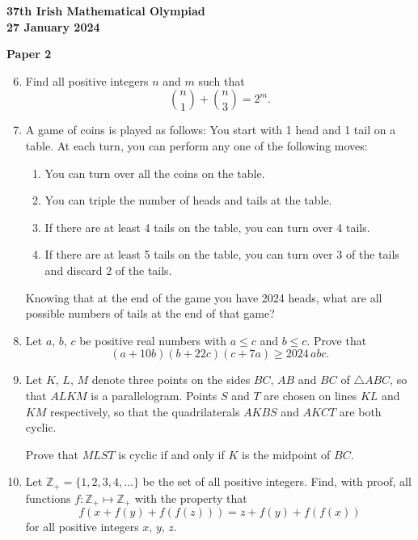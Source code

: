 \documentclass[12pt]{article}
\begin{document}
\newpage
\begin{center}
{\large\bfseries 37th Irish Mathematical Olympiad\\27 January 2024}
\end{center}
\bigskip\noindent\textbf{Paper 2}\bigskip
\begin{enumerate}
\setcounter{enumi}{5}
\item Find all positive integers $n$ and $m$ such that
\[
\binom{n}{1} + \binom{n}{3} = 2^m.
\]

\item A game of coins is played as follows: You start with 1 head and 1 tail on a table. At each turn, you can perform any one of the following moves:
\begin{enumerate}
\item[a)] You can turn over all the coins on the table.
\item[b)] You can triple the number of heads and tails at the table.
\item[c)] If there are at least 4 tails on the table, you can turn over 4 tails.
\item[d)] If there are at least 5 tails on the table, you can turn over 3 of the tails and discard 2 of the tails.
\end{enumerate}
Knowing that at the end of the game you have 2024 heads, what are all possible numbers of tails at the end of that game?

\item Let $a$, $b$, $c$ be positive real numbers with $a \le c$ and $b \le c$. Prove that
\[
(a + 10b)(b + 22c)(c + 7a) \ge 2024\, abc.
\]

\item Let $K$, $L$, $M$ denote three points on the sides $BC$, $AB$ and $BC$ of $\triangle ABC$, so that $ALKM$ is a parallelogram. Points $S$ and $T$ are chosen on lines $KL$ and $KM$ respectively, so that the quadrilaterals $AKBS$ and $AKCT$ are both cyclic.

Prove that $MLST$ is cyclic if and only if $K$ is the midpoint of $BC$.

\item Let $\mathbb{Z}_+ = \{1, 2, 3, 4, \ldots\}$ be the set of all positive integers. Find, with proof, all functions $f : \mathbb{Z}_+ \mapsto \mathbb{Z}_+$ with the property that
\[
f(x + f(y) + f(f(z))) = z + f(y) + f(f(x))
\]
for all positive integers $x$, $y$, $z$.
\end{enumerate}
\end{document}
